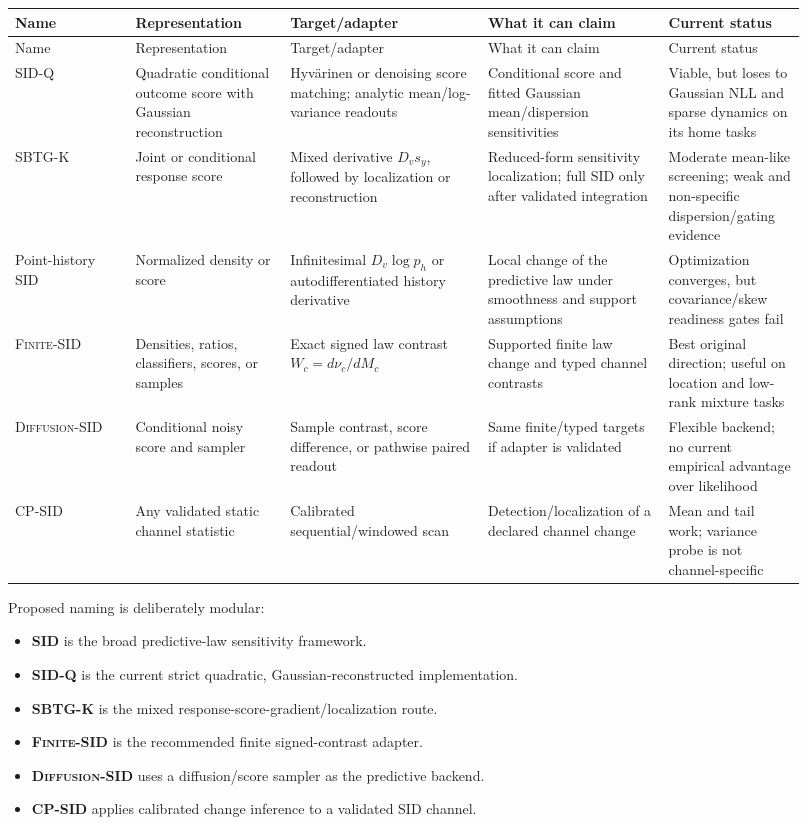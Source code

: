 \documentclass[10pt]{article}
\newcommand{\SIDQ}{\textnormal{\textsc{SID-Q}}\xspace}
\newcommand{\FiniteSID}{\textnormal{\textsc{Finite-SID}}\xspace}
\newcommand{\DiffSID}{\textnormal{\textsc{Diffusion-SID}}\xspace}
\newcommand{\SBTGK}{\textnormal{\textsc{SBTG-K}}\xspace}
\newcommand{\CPSID}{\textnormal{\textsc{CP-SID}}\xspace}
\begin{document}
\begingroup
\setlength{\tabcolsep}{3pt}
\begin{longtable}{@{}p{0.14\linewidth}p{0.18\linewidth}p{0.23\linewidth}p{0.21\linewidth}p{0.16\linewidth}@{}}
\toprule
Name & Representation & Target/adapter & What it can claim & Current status \\
\midrule
\endfirsthead
\toprule
Name & Representation & Target/adapter & What it can claim & Current status \\
\midrule
\endhead
\SIDQ & Quadratic conditional outcome score with Gaussian reconstruction & Hyv\"arinen or denoising score matching; analytic mean/log-variance readouts & Conditional score and fitted Gaussian mean/dispersion sensitivities & Viable, but loses to Gaussian NLL and sparse dynamics on its home tasks \\
\SBTGK & Joint or conditional response score & Mixed derivative \(D_v s_y\), followed by localization or reconstruction & Reduced-form sensitivity localization; full SID only after validated integration & Moderate mean-like screening; weak and non-specific dispersion/gating evidence \\
Point-history SID & Normalized density or score & Infinitesimal \(D_v\log p_h\) or autodifferentiated history derivative & Local change of the predictive law under smoothness and support assumptions & Optimization converges, but covariance/skew readiness gates fail \\
\FiniteSID & Densities, ratios, classifiers, scores, or samples & Exact signed law contrast \(W_c=d\nu_c/dM_c\) & Supported finite law change and typed channel contrasts & Best original direction; useful on location and low-rank mixture tasks \\
\DiffSID & Conditional noisy score and sampler & Sample contrast, score difference, or pathwise paired readout & Same finite/typed targets if adapter is validated & Flexible backend; no current empirical advantage over likelihood \\
\CPSID & Any validated static channel statistic & Calibrated sequential/windowed scan & Detection/localization of a declared channel change & Mean and tail work; variance probe is not channel-specific \\
\bottomrule
\end{longtable}
\endgroup

Proposed naming is deliberately modular:

\begin{itemize}
  \item \textbf{SID} is the broad predictive-law sensitivity framework.
  \item \textbf{\SIDQ} is the current strict quadratic, Gaussian-reconstructed implementation.
  \item \textbf{\SBTGK} is the mixed response-score-gradient/localization route.
  \item \textbf{\FiniteSID} is the recommended finite signed-contrast adapter.
  \item \textbf{\DiffSID} uses a diffusion/score sampler as the predictive backend.
  \item \textbf{\CPSID} applies calibrated change inference to a validated SID channel.
\end{itemize}
\end{document}
